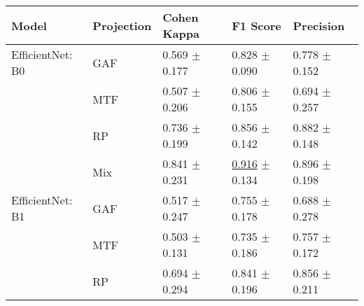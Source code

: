 
\begin{tabular}[t]{lllll}
\toprule
Model & Projection & Cohen Kappa & F1 Score & Precision \\
\midrule
EfficientNet: B0 & GAF & \textcolor[rgb]{0.6962025316,0.3037974684,0}{0.569} $\pm$ \textcolor[rgb]{0.3400275211,0.5000000000,0}{0.177} & \textcolor[rgb]{0.4231517510,0.5000000000,0}{0.828} $\pm$ \textcolor[rgb]{0.0544433560,0.5000000000,0}{0.090} & \textcolor[rgb]{0.3865030675,0.5000000000,0}{0.778} $\pm$ \textcolor[rgb]{0.0609210007,0.5000000000,0}{0.152} \\
 & MTF & \textcolor[rgb]{0.8386075949,0.1613924051,0}{0.507} $\pm$ \textcolor[rgb]{0.5010483176,0.4989516824,0}{0.206} & \textcolor[rgb]{0.5030067209,0.4969932791,0}{0.806} $\pm$ \textcolor[rgb]{0.4981776657,0.5000000000,0}{0.155} & \textcolor[rgb]{0.6073619632,0.3926380368,0}{0.694} $\pm$ \textcolor[rgb]{0.5747695565,0.4252304435,0}{0.257} \\
 & RP & \textcolor[rgb]{0.3158803222,0.5000000000,0}{0.736} $\pm$ \textcolor[rgb]{0.4632782795,0.5000000000,0}{0.199} & \textcolor[rgb]{0.3195525292,0.5000000000,0}{0.856} $\pm$ \textcolor[rgb]{0.4103539755,0.5000000000,0}{0.142} & \textcolor[rgb]{0.1104294479,0.5000000000,0}{0.882} $\pm$ \textcolor[rgb]{0.0429202964,0.5000000000,0}{0.148} \\
 & Mix & \textcolor[rgb]{0.0776754891,0.5000000000,0}{0.841} $\pm$ \textcolor[rgb]{0.6456888129,0.3543111871,0}{0.231} & \underline{\textcolor[rgb]{0.0992217899,0.5000000000,0}{0.916}} $\pm$ \textcolor[rgb]{0.3552176022,0.5000000000,0}{0.134} & \textcolor[rgb]{0.0736196319,0.5000000000,0}{0.896} $\pm$ \textcolor[rgb]{0.2866946969,0.5000000000,0}{0.198} \\
EfficientNet: B1 & GAF & \textcolor[rgb]{0.8164556962,0.1835443038,0}{0.517} $\pm$ \textcolor[rgb]{0.7344714342,0.2655285658,0}{0.247} & \textcolor[rgb]{0.6908383445,0.3091616555,0}{0.755} $\pm$ \textcolor[rgb]{0.6544468040,0.3455531960,0}{0.178} & \textcolor[rgb]{0.6257668712,0.3742331288,0}{0.688} $\pm$ \textcolor[rgb]{0.6764224307,0.3235775693,0}{0.278} \\
 & MTF & \textcolor[rgb]{0.8475258918,0.1524741082,0}{0.503} $\pm$ \textcolor[rgb]{0.0816749972,0.5000000000,0}{0.131} & \textcolor[rgb]{0.7645914397,0.2354085603,0}{0.735} $\pm$ \textcolor[rgb]{0.7107928934,0.2892071066,0}{0.186} & \textcolor[rgb]{0.4417177914,0.5000000000,0}{0.757} $\pm$ \textcolor[rgb]{0.1586694821,0.5000000000,0}{0.172} \\
 & RP & \textcolor[rgb]{0.4113924051,0.5000000000,0}{0.694} $\pm$ \textcolor[rgb]{1.0000000000,0.0000000000,0}{0.294} & \textcolor[rgb]{0.3756632473,0.5000000000,0}{0.841} $\pm$ \textcolor[rgb]{0.7777535685,0.2222464315,0}{0.196} & \textcolor[rgb]{0.1790295594,0.5000000000,0}{0.856} $\pm$ \textcolor[rgb]{0.3497679786,0.5000000000,0}{0.211} \\

\end{tabular}
